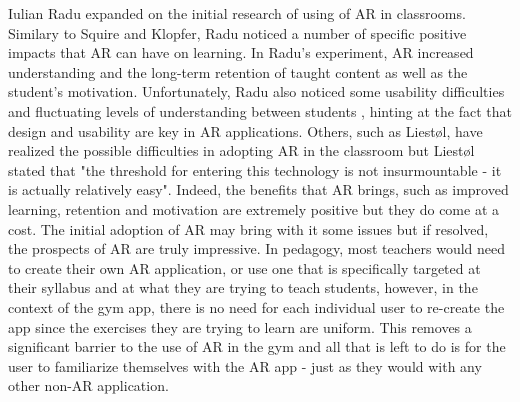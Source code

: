 \documentclass{l4proj}
\begin{document}
Iulian Radu expanded on the initial research of using of AR in classrooms. Similary to Squire and Klopfer, Radu noticed a number of specific positive impacts that AR can have on learning. In Radu's experiment, AR increased understanding and the long-term retention of taught content as well as the student's motivation\cite{radu_why_2012}. Unfortunately, Radu also noticed some usability difficulties and fluctuating levels of understanding between students \cite{radu_why_2012}, hinting at the fact that design and usability are key in AR applications. Others, such as Liestøl, have realized the possible difficulties in adopting AR in the classroom but Liestøl stated that "the threshold for entering this technology is not insurmountable - it is actually relatively easy"\cite{liestol_learning_2011}. Indeed, the benefits that AR brings, such as improved learning, retention and motivation are extremely positive but they do come at a cost. The initial adoption of AR may bring with it some issues but if resolved, the prospects of AR are truly impressive. In  pedagogy, most teachers would need to create their own AR application, or use one that is specifically targeted at their syllabus and at what they are trying to teach students, however, in the context of the gym app, there is no need for each individual user to re-create the app since the exercises they are trying to learn are uniform. This removes a significant barrier to the use of AR in the gym and all that is left to do is for the user to familiarize themselves with the AR app - just as they would with any other non-AR application. 
\end{document}
